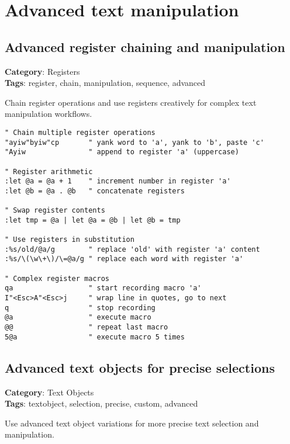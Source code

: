 {\chapter{Advanced text manipulation}
\section{Advanced register chaining and manipulation}

\textbf{Category}: Registers\\ \textbf{Tags}: register, chain, manipulation, sequence, advanced
\vspace{0.5cm}

Chain register operations and use registers creatively for complex text manipulation workflows.

\begin{Exa*}{}
\begin{Verbatim}[fontsize=\footnotesize, breaklines, breakanywhere]
" Chain multiple register operations
"ayiw"byiw"cp       " yank word to 'a', yank to 'b', paste 'c'
"Ayiw               " append to register 'a' (uppercase)

" Register arithmetic
:let @a = @a + 1    " increment number in register 'a'
:let @b = @a . @b   " concatenate registers

" Swap register contents
:let tmp = @a | let @a = @b | let @b = tmp

" Use registers in substitution
:%s/old/@a/g        " replace 'old' with register 'a' content
:%s/\(\w\+\)/\=@a/g " replace each word with register 'a'

" Complex register macros
qa                  " start recording macro 'a'
I"<Esc>A"<Esc>j     " wrap line in quotes, go to next
q                   " stop recording
@a                  " execute macro
@@                  " repeat last macro
5@a                 " execute macro 5 times
\end{Verbatim}
\end{Exa*}

\section{Advanced text objects for precise selections}

\textbf{Category}: Text Objects\\ \textbf{Tags}: textobject, selection, precise, custom, advanced
\vspace{0.5cm}

Use advanced text object variations for more precise text selection and manipulation.

}
